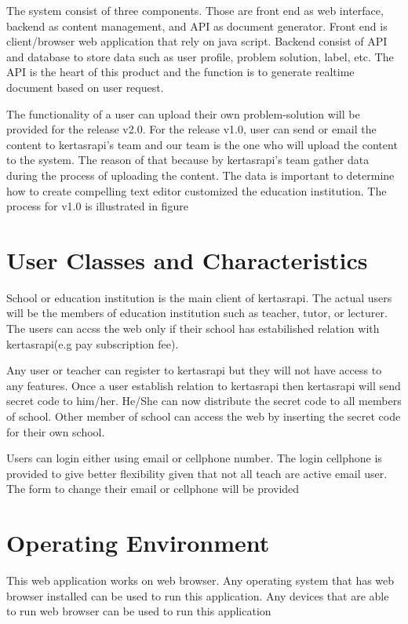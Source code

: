 \documentclass{scrreprt}
\begin{document}
The system consist of three components. Those are front end as web interface, backend as content management, and API as document generator. Front end is client/browser web application that rely on java script. Backend consist of API and database to store data such as user profile, problem solution, label, etc. The API is the heart of this product and the function is to generate realtime document based on user request. 

The functionality of a user can upload their own problem-solution will be provided for the release v2.0. For the release v1.0, user can send or email the content to kertasrapi's team and our team is the one who will upload the content to the system. The reason of that because by kertasrapi's team gather data during the process of uploading the content. The data is important to determine how to create compelling text editor customized the education institution. The process for v1.0 is illustrated in figure


\section{User Classes and Characteristics}
School or education institution is the main client of kertasrapi. The actual users will be the members of education institution such as teacher, tutor, or lecturer. The users can accss the web only if their school has estabilished relation with kertasrapi(e.g pay subscription fee). 

Any user or teacher can register to kertasrapi but they will not have access to any features. Once a user establish relation to kertasrapi then kertasrapi will send secret code to him/her. He/She can now distribute the secret code to all members of school. Other member of school can access the web by inserting the secret code for their own school.

Users can login either using email or cellphone number. The login cellphone is provided to give better flexibility given that not all teach are active email user. The form to change their email or cellphone will be provided

\section{Operating Environment}
This web application works on web browser. Any operating system that has web browser installed can be used to run this application. Any devices that are able to run web browser can be used to run this application
\end{document}
